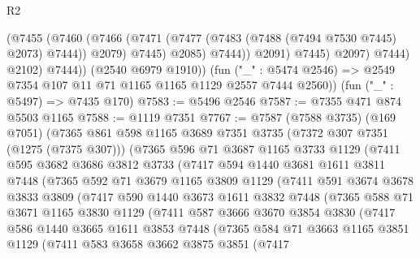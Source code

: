 \begin{lexlean}{R2}
\begin{coremodule}
                        (@7455
                          (@7460
                            (@7466
                              (@7471 (@7477 (@7483 (@7488 (@7494 @7530 @7445) @2073) @7444)) @2079)
                              @7445)
                            @2085)
                          @7444))
                      @2091)
                    @7445)
                  @2097)
                @7444)
              @2102)
            @7444))
        (@2540 @6979 @1910))
      (fun ("_" : @5474 @2546) => @2549 @7354 @107 @11 @71 @1165 @1165 @1129 @2557 @7444 @2560))
    (fun ("_" : @5497) => @7435 @170)
@7583 := @5496 @2546
@7587 := @7355 @471 @874 @5503 @1165
@7588 := @1119 @7351
@7767 := @7587
    (@7588 @3735)
    (@169 @7051)
    (@7365
      @861
      @598
      @1165
      @3689
      @7351
      @3735
      (@7372 @307 @7351 (@1275 (@7375 @307)))
      (@7365
        @596
        @71
        @3687
        @1165
        @3733
        @1129
        (@7411
          @595
          @3682
          @3686
          @3812
          @3733
          (@7417
            @594
            @1440
            @3681
            @1611
            @3811
            @7448
            (@7365
              @592
              @71
              @3679
              @1165
              @3809
              @1129
              (@7411
                @591
                @3674
                @3678
                @3833
                @3809
                (@7417
                  @590
                  @1440
                  @3673
                  @1611
                  @3832
                  @7448
                  (@7365
                    @588
                    @71
                    @3671
                    @1165
                    @3830
                    @1129
                    (@7411
                      @587
                      @3666
                      @3670
                      @3854
                      @3830
                      (@7417
                        @586
                        @1440
                        @3665
                        @1611
                        @3853
                        @7448
                        (@7365
                          @584
                          @71
                          @3663
                          @1165
                          @3851
                          @1129
                          (@7411
                            @583
                            @3658
                            @3662
                            @3875
                            @3851
                            (@7417

\end{coremodule}
\end{lexlean}
